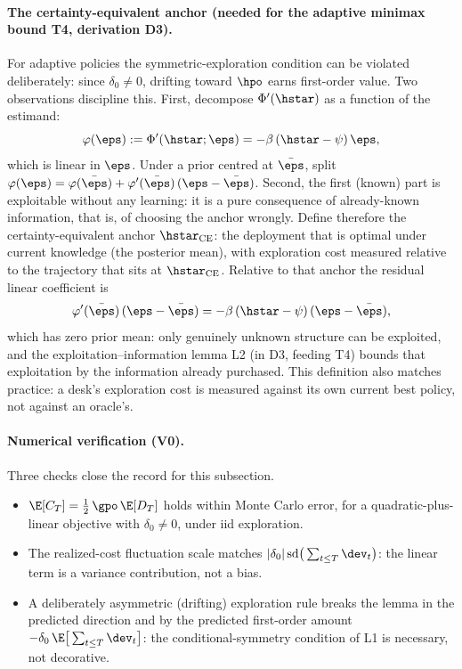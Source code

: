 \paragraph{The certainty-equivalent anchor (needed for the adaptive
minimax bound T4, derivation D3).}
For adaptive policies the symmetric-exploration condition can be violated
deliberately: since $\delta_0 \neq 0$, drifting toward $\hpo$ earns
first-order value. Two observations discipline this.
First, decompose $\Phi'(\hstar)$ as a function of the estimand:
\begin{equation*}
  \varphi(\eps) := \Phi'(\hstar; \eps) = -\beta\,(\hstar - \psi)\,\eps,
\end{equation*}
which is linear in $\eps$. Under a prior centred at $\bar\eps$, split
$\varphi(\eps) = \varphi(\bar\eps)
+ \varphi'(\bar\eps)\,(\eps - \bar\eps)$.
Second, the first (known) part is exploitable without any learning: it is a
pure consequence of already-known information, that is, of choosing the
anchor wrongly. Define therefore the certainty-equivalent anchor
$\hstar_{\mathrm{CE}}$: the deployment that is optimal under current
knowledge (the posterior mean), with exploration cost measured relative to
the trajectory that sits at $\hstar_{\mathrm{CE}}$. Relative to that anchor
the residual linear coefficient is
\begin{equation*}
  \varphi'(\bar\eps)\,(\eps - \bar\eps)
  = -\beta\,(\hstar - \psi)\,(\eps - \bar\eps),
\end{equation*}
which has zero prior mean: only genuinely unknown structure can be
exploited, and the exploitation--information lemma L2 (in D3, feeding T4)
bounds that exploitation by the information already purchased. This
definition also matches practice: a desk's exploration cost is measured
against its own current best policy, not against an oracle's.

\paragraph{Numerical verification (V0).}
Three checks close the record for this subsection.
\begin{itemize}
  \item $\E[C_T] = \tfrac{1}{2}\,\gpo\,\E[D_T]$ holds within Monte Carlo
    error, for a quadratic-plus-linear objective with $\delta_0 \neq 0$,
    under iid exploration.
  \item The realized-cost fluctuation scale matches
    $|\delta_0|\,\mathrm{sd}\big(\sum_{t\le T}\dev_t\big)$: the linear
    term is a variance contribution, not a bias.
  \item A deliberately asymmetric (drifting) exploration rule breaks the
    lemma in the predicted direction and by the predicted first-order
    amount $-\delta_0\,\E\big[\sum_{t\le T}\dev_t\big]$: the
    conditional-symmetry condition of L1 is necessary, not decorative.
\end{itemize}

